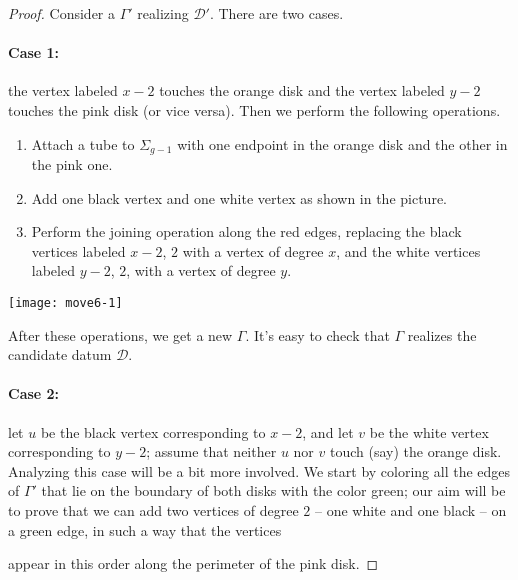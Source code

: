 \documentclass{article}
\begin{document}
\begin{proof}
Consider a \dessin{} $\Gamma'$ realizing $\mathcal{D}'$. There are two cases.
\paragraph{Case 1:} the vertex labeled $x-2$ touches the orange disk and the vertex labeled $y-2$ touches the pink disk (or vice versa). Then we perform the following operations.
\begin{enumerate}
\item Attach a tube to $\Sigma_{g-1}$ with one endpoint in the orange disk and the other in the pink one.
\item Add one black vertex and one white vertex as shown in the picture.
\item Perform the joining operation along the red edges, replacing the black vertices labeled $x-2$, $2$ with a vertex of degree $x$, and the white vertices labeled $y-2$, $2$, with a vertex of degree $y$.
\end{enumerate}
\begin{center}
\texttt{[image: move6-1]}
\end{center}
After these operations, we get a new \dessin{} $\Gamma$. It's easy to check that $\Gamma$ realizes the candidate datum $\mathcal{D}$.
\paragraph{Case 2:} let $u$ be the black vertex corresponding to $x-2$, and let $v$ be the white vertex corresponding to $y-2$; assume that neither $u$ nor $v$ touch (say) the orange disk. Analyzing this case will be a bit more involved. We start by coloring all the edges of $\Gamma'$  that lie on the boundary of both disks with the color green; our aim will be to prove that we can add two vertices of degree $2$ -- one white and one black -- on a green edge, in such a way that the vertices
\begin{center}
\end{center}
appear in this order along the perimeter of the pink disk.


\end{proof}
\end{document}
